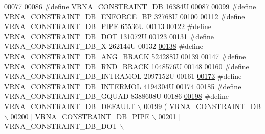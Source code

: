 \begin{DoxyCode}
00077 
\hypertarget{constraints__hard_8h_source.tex_l00086}{}\hyperlink{group__hard__constraints_ga4bfc2f15c4f261c62a11af9d2aa80c90}{00086} \textcolor{preprocessor}{#define VRNA\_CONSTRAINT\_DB                16384U}
00087 
\hypertarget{constraints__hard_8h_source.tex_l00099}{}\hyperlink{group__hard__constraints_ga29ebe940110d60ab798fdacbcdbbfb7d}{00099} \textcolor{preprocessor}{#define VRNA\_CONSTRAINT\_DB\_ENFORCE\_BP           32768U}
00100 
\hypertarget{constraints__hard_8h_source.tex_l00112}{}\hyperlink{group__hard__constraints_ga13053547a2de5532b64b64d35e097ae1}{00112} \textcolor{preprocessor}{#define VRNA\_CONSTRAINT\_DB\_PIPE              65536U}
00113 
\hypertarget{constraints__hard_8h_source.tex_l00122}{}\hyperlink{group__hard__constraints_ga369bea82eae75fbe626f409fa425747e}{00122} \textcolor{preprocessor}{#define VRNA\_CONSTRAINT\_DB\_DOT               131072U}
00123 
\hypertarget{constraints__hard_8h_source.tex_l00131}{}\hyperlink{group__hard__constraints_ga7283bbe0f8954f7b030ecc3f2d1932b2}{00131} \textcolor{preprocessor}{#define VRNA\_CONSTRAINT\_DB\_X                 262144U}
00132 
\hypertarget{constraints__hard_8h_source.tex_l00138}{}\hyperlink{constraints__hard_8h_ad54c1315a47d55653dcaa5de6e544b77}{00138} \textcolor{preprocessor}{#define VRNA\_CONSTRAINT\_DB\_ANG\_BRACK         524288U}
00139 
\hypertarget{constraints__hard_8h_source.tex_l00147}{}\hyperlink{group__hard__constraints_gac17b034852c914bc5879954c65d7e74b}{00147} \textcolor{preprocessor}{#define VRNA\_CONSTRAINT\_DB\_RND\_BRACK         1048576U}
00148 
\hypertarget{constraints__hard_8h_source.tex_l00160}{}\hyperlink{group__hard__constraints_ga5c17253f5a39d1d49b0fb11f5196982a}{00160} \textcolor{preprocessor}{#define VRNA\_CONSTRAINT\_DB\_INTRAMOL    2097152U}
00161 
\hypertarget{constraints__hard_8h_source.tex_l00173}{}\hyperlink{group__hard__constraints_ga31d0ebb9755ca8a4acafc14f00ca755d}{00173} \textcolor{preprocessor}{#define VRNA\_CONSTRAINT\_DB\_INTERMOL    4194304U}
00174 
\hypertarget{constraints__hard_8h_source.tex_l00185}{}\hyperlink{group__hard__constraints_ga75cfab03cdc97c95b3ce8bb29f52b08e}{00185} \textcolor{preprocessor}{#define VRNA\_CONSTRAINT\_DB\_GQUAD                8388608U}
00186 
\hypertarget{constraints__hard_8h_source.tex_l00198}{}\hyperlink{group__hard__constraints_ga1c3864bdc92147a4d93de2b1b4356177}{00198} \textcolor{preprocessor}{#define VRNA\_CONSTRAINT\_DB\_DEFAULT \(\backslash\)}
00199 \textcolor{preprocessor}{    (   VRNA\_CONSTRAINT\_DB \(\backslash\)}
00200 \textcolor{preprocessor}{      | VRNA\_CONSTRAINT\_DB\_PIPE \(\backslash\)}
00201 \textcolor{preprocessor}{      | VRNA\_CONSTRAINT\_DB\_DOT \(\backslash\)}

\end{DoxyCode}
